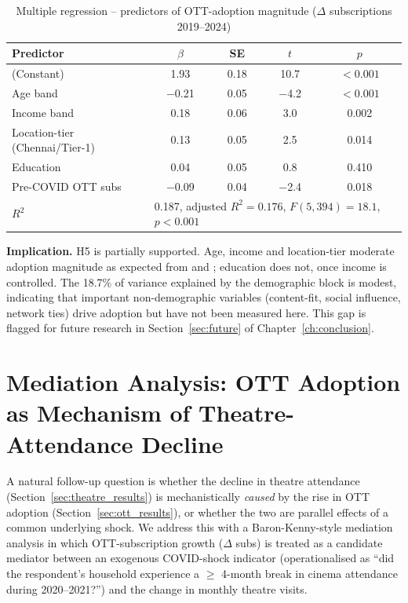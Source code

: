 \begin{table}[h]
\centering
\caption{Multiple regression -- predictors of OTT-adoption magnitude
(\(\Delta\) subscriptions 2019--2024)}
\label{tab:moderators}
\small
\begin{tabular}{lcccc}
\toprule
\textbf{Predictor}  & \textbf{$\beta$} & \textbf{SE} & \textbf{$t$} & \textbf{$p$}\\
\midrule
(Constant)            &  1.93 & 0.18 & 10.7 & $<0.001$ \\
Age band              & $-$0.21 & 0.05 & $-$4.2 & $<0.001$ \\
Income band           &  0.18 & 0.06 &  3.0 & 0.002 \\
Location-tier (Chennai/Tier-1) &  0.13 & 0.05 &  2.5 & 0.014 \\
Education             &  0.04 & 0.05 &  0.8 & 0.410 \\
Pre-COVID OTT subs    & $-$0.09 & 0.04 & $-$2.4 & 0.018 \\
\midrule
$R^2$ & \multicolumn{4}{l}{0.187, adjusted $R^2 = 0.176$, $F(5,394) = 18.1$, $p<0.001$}\\
\bottomrule
\end{tabular}
\end{table}

\textbf{Implication.}  H5 is partially supported.  Age, income and
location-tier moderate adoption magnitude as expected from
\citet{rogers2003} and \citet{shukla2022}; education does not, once
income is controlled.  The 18.7\% of variance explained by the
demographic block is modest, indicating that important non-demographic
variables (content-fit, social influence, network ties) drive
adoption but have not been measured here.  This gap is flagged for
future research in Section~\ref{sec:future} of
Chapter~\ref{ch:conclusion}.

\section{Mediation Analysis: OTT Adoption as Mechanism of
Theatre-Attendance Decline}
\label{sec:mediation}

A natural follow-up question is whether the decline in theatre
attendance (Section~\ref{sec:theatre_results}) is mechanistically
\emph{caused} by the rise in OTT adoption (Section~\ref{sec:ott_results}),
or whether the two are parallel effects of a common underlying
shock.  We address this with a Baron-Kenny-style mediation analysis
\citep{tashakkori2010,creswell2018} in which OTT-subscription growth
($\Delta$ subs) is treated as a candidate mediator between an
exogenous COVID-shock indicator (operationalised as ``did the
respondent's household experience a $\geq$ 4-month break in cinema
attendance during 2020--2021?'') and the change in monthly theatre
visits.

